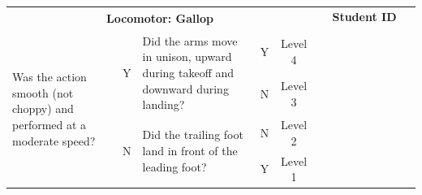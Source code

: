 \documentclass[
  letterpaper,
  DIV=11,
  numbers=noendperiod]{scrartcl}
\begin{document}
\begin{tabular}{|p{5.5cm}|c|p{5.5cm}|c|c|*{9}{p{1.07cm}|}}
\hline
\multicolumn{5}{|c|}{\multirow{2}{*}{\centering \textbf{Locomotor: Gallop}}} & \multicolumn{9}{c|}{\textbf{Student ID}} \\ 
\cline{6-14}
\multicolumn{5}{|c|}{} & & & & & & & & & \\
\hline
\multirow{4}{5.5cm}{\raggedright {\footnotesize Was the action smooth (not choppy) and performed at a moderate speed?}} 
& \multirow{2}{*}{\footnotesize Y} 
& \multirow{2}{5cm}{\raggedright {\footnotesize Did the arms move in unison, upward during takeoff and downward during landing?}} & {\footnotesize Y} & {\footnotesize Level 4} & & & & & & & & & \\
\cline{4-14}
& & & {\footnotesize N} & {\footnotesize Level 3} & & & & & & & & & \\
\cline{2-14}
& \multirow{2}{*}{\footnotesize N} & \multirow{2}{5cm}{\raggedright {\footnotesize Did the trailing foot land in front of the leading foot?}} & {\footnotesize N} & {\footnotesize Level 2} & & & & & & & & & \\
\cline{4-14}
& & & {\footnotesize Y} & {\footnotesize Level 1} & & & & & & & & & \\
\hline
\end{tabular}

\vspace{.5em}
\end{document}
